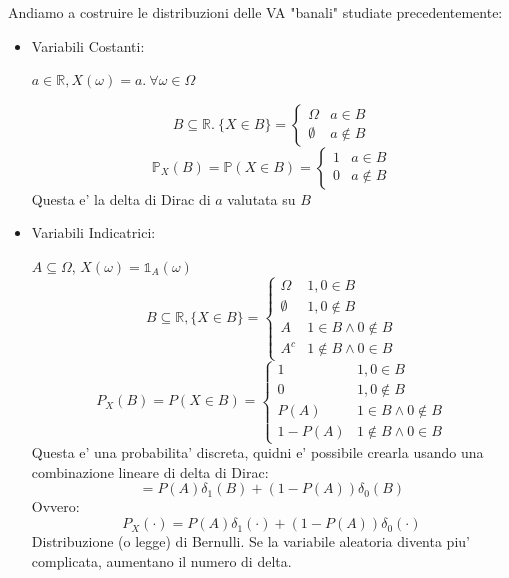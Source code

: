  Andiamo a costruire le distribuzioni delle VA "banali" studiate precedentemente:
  \begin{itemize}
  \item Variabili Costanti:

    $ a \in \mathbb{R}, X(\omega) = a.\ \forall \omega \in \Omega $

    \[
    B \subseteq \mathbb{R}.\ \{X \in B\} = \begin{cases}
    \Omega & a \in B\\
    \emptyset &  a \notin B
    \end{cases}
    \]
    \[
    \mathbb{P}_X(B) = \mathbb{P}(X \in B) = \begin{cases}
    1 & a \in B\\
    0 & a \notin B
    \end{cases}
    \]
      Questa e' la delta di Dirac di $ a $ valutata su $ B $
    \item Variabili Indicatrici:

      $ A \subseteq \Omega $, $ X(\omega) = \mathbb{1}_A(\omega) $
      \[
      B \subseteq \mathbb{R}, \{X \in B\} = \begin{cases}
      \Omega & 1, 0 \in B\\
      \emptyset & 1, 0 \notin B\\
      A & 1 \in B \land 0 \notin B\\
      A^{c} & 1 \notin B \land 0 \in B
      \end{cases}
      \]
      \[
        P_X(B) = P(X \in B) = \begin{cases}
        1 & 1,0 \in B\\
        0 & 1,0 \notin B\\
          P(A) & 1 \in B \land 0 \notin B\\
          1-P(A) & 1 \notin B \land 0 \in B
        \end{cases}
      \]
      Questa e' una probabilita' discreta, quidni e' possibile crearla usando una combinazione lineare di delta di Dirac: 
      \[
        = P(A)\delta_1(B) + (1-P(A))\delta_0(B)
      \]
      Ovvero:
      \[
        P_X(\cdot) = P(A)\delta_1(\cdot) + (1-P(A))\delta_0(\cdot)
      \]
      Distribuzione (o legge) di Bernulli. Se la variabile aleatoria diventa piu' complicata, aumentano il numero di delta.
  \end{itemize}

